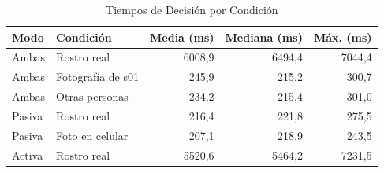 \begin{table}[htbp]
\caption{Tiempos de Decisión por Condición}
\label{tab:avances-tiempos}
{\small\linespread{1}\selectfont
\begin{tabular}{@{}P{1.5cm}P{3.1cm}rrr@{}}
\toprule
Modo & Condición & Media (ms) & Mediana (ms) & Máx. (ms) \\
\midrule
Ambas & Rostro real & 6008,9 & 6494,4 & 7044,4 \\[0.5em]
Ambas & Fotografía de s01 & 245,9 & 215,2 & 300,7 \\[0.5em]
Ambas & Otras personas & 234,2 & 215,4 & 301,0 \\[0.5em]
Pasiva & Rostro real & 216,4 & 221,8 & 275,5 \\[0.5em]
Pasiva & Foto en celular & 207,1 & 218,9 & 243,5 \\[0.5em]
Activa & Rostro real & 5520,6 & 5464,2 & 7231,5 \\[0.5em]
\bottomrule
\end{tabular}}
\end{table}
